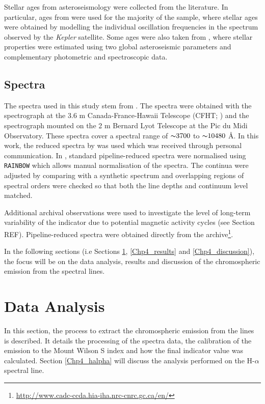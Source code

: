 Stellar ages from asteroseismology were collected from the literature. In particular, ages from \citet{Silva_Aguirre_etal_2017} were used for the majority of the sample, where stellar ages were obtained by modelling the individual oscillation frequencies in the spectrum observed by the \textit{Kepler} satellite. Some ages were also taken from \citet{Chaplin_etal_2014}, where stellar properties were estimated using two global asteroseismic parameters and complementary photometric and spectroscopic data.

\subsection{Spectra}
The spectra used in this study stem from \citet{Bruntt_etal_2012}. The spectra were obtained with the \esp spectrograph at the 3.6 m Canada-France-Hawaii Telescope (CFHT; \citealt{Donati_etal_2006}) and the \narval spectrograph \citep{Auriere_2003} mounted on the 2 m Bernard Lyot Telescope at the Pic du Midi Observatory. These spectra cover a spectral range of ${\thicksim} 3700$ to ${\thicksim} 10480$ \AA. In this work, the reduced spectra by \citet{Bruntt_etal_2012} was used which was received through personal communication. In \citet{Bruntt_etal_2012}, standard pipeline-reduced spectra were normalised using \texttt{RAINBOW} \citep{Bruntt_etal_2010} which allows manual normalisation of the spectra. The continua were adjusted by comparing with a synthetic spectrum and overlapping regions of spectral orders were checked so that both the line depths and continuum level matched.

Additional archival observations were used to investigate the level of long-term variability of the \Rprime indicator due to potential magnetic activity cycles (see Section REF). Pipeline-reduced spectra were obtained directly from the \esp archive\footnote{\url{http://www.cadc-ccda.hia-iha.nrc-cnrc.gc.ca/en/}}.

In the following sections (i.e Sections \ref{Chp4_data_analysis}, \ref{Chp4_results} and \ref{Chp4_discussion}), the focus will be on the data analysis, results and discussion of the chromospheric emission from the \caII spectral lines.

\section{Data Analysis}
\label{Chp4_data_analysis}

In this section, the process to extract the chromospheric emission from the \caII lines is described. It details the processing of the spectra data, the calibration of the emission to the Mount Wilson S index and how the final \Rprime indicator value was calculated. Section \ref{Chp4_halpha} will discuss the analysis performed on the H-$\alpha$ spectral line.

